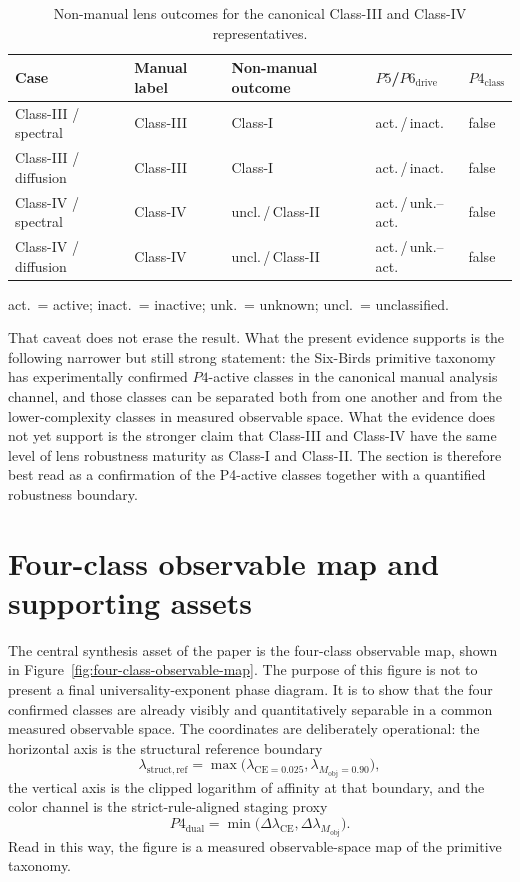 \documentclass[11pt]{article}
\begin{document}
\begin{table}[tbp]
\centering
\small
\caption{Non-manual lens outcomes for the canonical Class-III and Class-IV representatives.}
\label{tab:class-iii-iv-lens-caveat}
\setlength{\tabcolsep}{4pt}
\begin{tabularx}{\linewidth}{@{}l l Y l l@{}}
\toprule
Case & Manual label & Non-manual outcome & $P5$/$P6_{\mathrm{drive}}$ & $P4_{\mathrm{class}}$ \\
\midrule
Class-III / spectral  & Class-III & Class-I              & act.\,/\,inact.  & false \\
Class-III / diffusion & Class-III & Class-I              & act.\,/\,inact.  & false \\
Class-IV / spectral   & Class-IV  & uncl.\,/\,Class-II   & act.\,/\,unk.--act. & false \\
Class-IV / diffusion  & Class-IV  & uncl.\,/\,Class-II   & act.\,/\,unk.--act. & false \\
\bottomrule
\end{tabularx}

\smallskip
\begin{flushleft}
\footnotesize
act.\ = active; inact.\ = inactive; unk.\ = unknown; uncl.\ = unclassified.
\end{flushleft}
\end{table}

That caveat does not erase the result. What the present evidence supports is the following narrower but still strong statement: the Six-Birds primitive taxonomy has experimentally confirmed $P4$-active classes in the canonical manual analysis channel, and those classes can be separated both from one another and from the lower-complexity classes in measured observable space. What the evidence does not yet support is the stronger claim that Class-III and Class-IV have the same level of lens robustness maturity as Class-I and Class-II. The section is therefore best read as a confirmation of the P4-active classes together with a quantified robustness boundary.
 \section{Four-class observable map and supporting assets}
\label{sec:observable-map-support}

The central synthesis asset of the paper is the four-class observable map, shown in Figure~\ref{fig:four-class-observable-map}. The purpose of this figure is not to present a final universality-exponent phase diagram. It is to show that the four confirmed classes are already visibly and quantitatively separable in a common measured observable space. The coordinates are deliberately operational: the horizontal axis is the structural reference boundary
\[
\lambda_{\mathrm{struct,ref}}=\max\!\bigl(\lambda_{\mathrm{CE}=0.025},\lambda_{M_{\mathrm{obj}}=0.90}\bigr),
\]
the vertical axis is the clipped logarithm of affinity at that boundary, and the color channel is the strict-rule-aligned staging proxy
\[
P4_{\mathrm{dual}}=\min\!\bigl(\Delta\lambda_{\mathrm{CE}},\Delta\lambda_{M_{\mathrm{obj}}}\bigr).
\]
Read in this way, the figure is a measured observable-space map of the primitive taxonomy.
\end{document}
